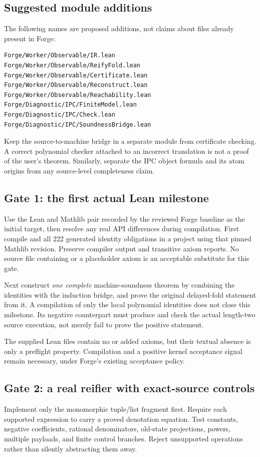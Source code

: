 \subsection{Suggested module additions}
The following names are proposed additions, not claims about files already
present in Forge:
\begin{lstlisting}
Forge/Worker/Observable/IR.lean
Forge/Worker/Observable/ReifyFold.lean
Forge/Worker/Observable/Certificate.lean
Forge/Worker/Observable/Reconstruct.lean
Forge/Worker/Observable/Reachability.lean
Forge/Diagnostic/IPC/FiniteModel.lean
Forge/Diagnostic/IPC/Check.lean
Forge/Diagnostic/IPC/SoundnessBridge.lean
\end{lstlisting}

Keep the source-to-machine bridge in a separate module from certificate
checking. A correct polynomial checker attached to an incorrect translation is
not a proof of the user's theorem. Similarly, separate the IPC object formula
and its atom origins from any source-level completeness claim.

\subsection{Gate 1: the first actual Lean milestone}
Use the Lean and Mathlib pair recorded by the reviewed Forge baseline as the
initial target, then resolve any real API differences during compilation. First
compile  and all 222 generated identity obligations in
a project using that pinned Mathlib revision. Preserve compiler output and
transitive axiom reports. No source file containing  or a
placeholder axiom is an acceptable substitute for this gate.

Next construct \emph{one complete} machine-soundness theorem by combining the
identities with the induction bridge, and prove the original delayed-fold
statement from it. A compilation of only the local polynomial identities does
not close this milestone. Its negative counterpart must produce and check the
actual length-two source execution, not merely fail to prove the positive
statement.

The supplied Lean files contain no  or added axioms, but their
textual absence is only a preflight property. Compilation and a positive kernel
acceptance signal remain necessary, under Forge's existing acceptance policy.

\subsection{Gate 2: a real reifier with exact-source controls}
Implement only the monomorphic tuple/list fragment first. Require each
supported expression to carry a proved denotation equation. Test constants,
negative coefficients, rational denominators, old-state projections, powers,
multiple payloads, and finite control branches. Reject unsupported operations
rather than silently abstracting them away.

